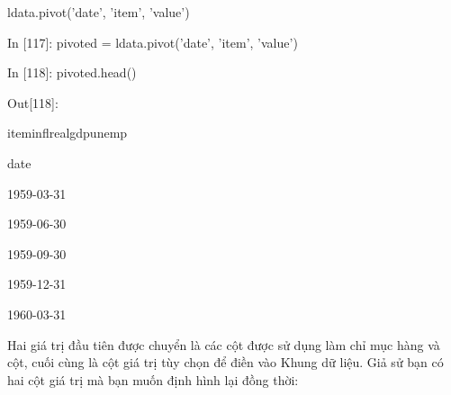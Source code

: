 ldata.pivot('date', 'item', 'value')
\par\quad\textup In [117]: pivoted = ldata.pivot('date', 'item', 'value')
\par\quad\textup In [118]: pivoted.head()
\par\quad\textup Out[118]:
\par\quad\textup item\quad\quad\quad\quad infl\quad realgdp\quad unemp
\par\quad date
\par\quad\textup 1959-03-31
\par\quad\textup 1959-06-30
\par\quad\textup 1959-09-30
\par\quad\textup 1959-12-31
\par\quad\textup 1960-03-31
\par\quad\textup Hai giá trị đầu tiên được chuyển là các cột được sử dụng làm chỉ mục hàng và cột, cuối cùng là cột giá trị tùy chọn để điền vào Khung dữ liệu. Giả sử bạn có hai cột giá trị mà bạn muốn định hình lại đồng thời:

